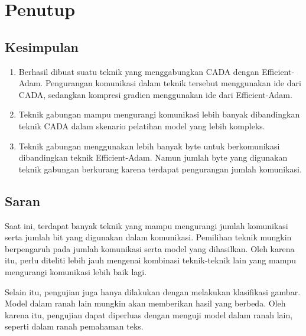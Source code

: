 \chapter{Penutup}

\section{Kesimpulan}
\begin{enumerate}
  \item Berhasil dibuat suatu teknik yang menggabungkan CADA dengan Efficient-Adam. Pengurangan komunikasi dalam teknik tersebut menggunakan ide dari CADA, sedangkan kompresi gradien menggunakan ide dari Efficient-Adam.
  \item Teknik gabungan mampu mengurangi komunikasi lebih banyak dibandingkan teknik CADA dalam skenario pelatihan model yang lebih kompleks.
  \item Teknik gabungan menggunakan lebih banyak byte untuk berkomunikasi dibandingkan teknik Efficient-Adam. Namun jumlah byte yang digunakan teknik gabungan berkurang karena terdapat pengurangan jumlah komunikasi.
\end{enumerate}

\section{Saran}
Saat ini, terdapat banyak teknik yang mampu mengurangi jumlah komunikasi serta jumlah bit yang digunakan dalam komunikasi. Pemilihan teknik mungkin berpengaruh pada jumlah komunikasi serta model yang dihasilkan. Oleh karena itu, perlu diteliti lebih jauh mengenai kombinasi teknik-teknik lain yang mampu mengurangi komunikasi lebih baik lagi.

Selain itu, pengujian juga hanya dilakukan dengan melakukan klasifikasi gambar. Model dalam ranah lain mungkin akan memberikan hasil yang berbeda. Oleh karena itu, pengujian dapat diperluas dengan menguji model dalam ranah lain, seperti dalam ranah pemahaman teks.
